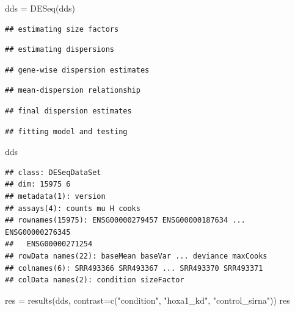 \documentclass[
]{article}
\newenvironment{Shaded}{\begin{snugshade}}{\end{snugshade}}
\newcommand{\AttributeTok}[1]{\textcolor[rgb]{0.77,0.63,0.00}{#1}}
\newcommand{\FunctionTok}[1]{\textcolor[rgb]{0.00,0.00,0.00}{#1}}
\newcommand{\NormalTok}[1]{#1}
\newcommand{\OtherTok}[1]{\textcolor[rgb]{0.56,0.35,0.01}{#1}}
\newcommand{\StringTok}[1]{\textcolor[rgb]{0.31,0.60,0.02}{#1}}
\begin{document}
\begin{Shaded}
\begin{Highlighting}[]
\NormalTok{dds }\OtherTok{=} \FunctionTok{DESeq}\NormalTok{(dds)}
\end{Highlighting}
\end{Shaded}

\begin{verbatim}
## estimating size factors
\end{verbatim}

\begin{verbatim}
## estimating dispersions
\end{verbatim}

\begin{verbatim}
## gene-wise dispersion estimates
\end{verbatim}

\begin{verbatim}
## mean-dispersion relationship
\end{verbatim}

\begin{verbatim}
## final dispersion estimates
\end{verbatim}

\begin{verbatim}
## fitting model and testing
\end{verbatim}

\begin{Shaded}
\begin{Highlighting}[]
\NormalTok{dds}
\end{Highlighting}
\end{Shaded}

\begin{verbatim}
## class: DESeqDataSet 
## dim: 15975 6 
## metadata(1): version
## assays(4): counts mu H cooks
## rownames(15975): ENSG00000279457 ENSG00000187634 ... ENSG00000276345
##   ENSG00000271254
## rowData names(22): baseMean baseVar ... deviance maxCooks
## colnames(6): SRR493366 SRR493367 ... SRR493370 SRR493371
## colData names(2): condition sizeFactor
\end{verbatim}

\begin{Shaded}
\begin{Highlighting}[]
\NormalTok{res }\OtherTok{=} \FunctionTok{results}\NormalTok{(dds, }\AttributeTok{contrast=}\FunctionTok{c}\NormalTok{(}\StringTok{"condition"}\NormalTok{, }\StringTok{"hoxa1\_kd"}\NormalTok{, }\StringTok{"control\_sirna"}\NormalTok{))}
\NormalTok{res}
\end{Highlighting}
\end{Shaded}
\end{document}
